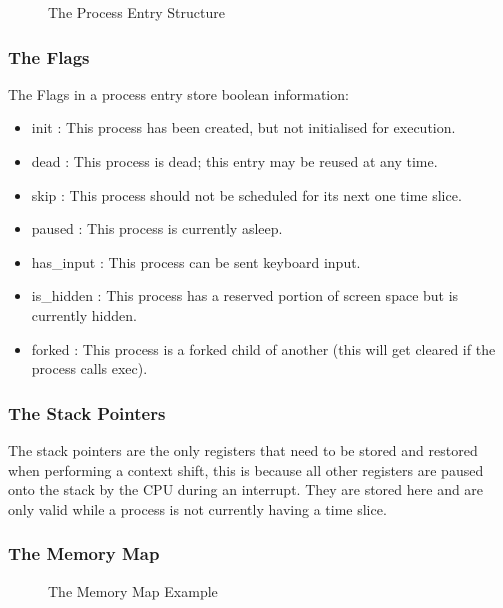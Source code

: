 \documentclass[a4paper]{report}
\begin{document}
\begin{figure}[ht]
  \centering

  \def\svgwidth{\columnwidth}
  \caption{The Process Entry Structure}
  \label{fig:schedulerscreen}
\end{figure}

\subsubsection{The Flags}

The Flags in a process entry store boolean information:
\begin{itemize}
\item init : This process has been created, but not initialised for execution.
\item dead : This process is dead; this entry may be reused at any time.
\item skip : This process should not be scheduled for its next one time slice.
\item paused : This process is currently asleep.
\item has\_input : This process can be sent keyboard input.
\item is\_hidden : This process has a reserved portion of screen space but is currently hidden.
\item forked : This process is a forked child of another (this will get cleared if the process calls exec).
\end{itemize}

\subsubsection{The Stack Pointers}
The stack pointers are the only registers that need to be stored and restored when performing a context shift, this is because all other registers are paused onto the stack by the CPU during an interrupt. They are stored here and are only valid while a process is not currently having a time slice.

\subsubsection{The Memory Map}
\begin{figure}[ht]
  \centering

  \def\svgwidth{\columnwidth}
  \caption{The Memory Map Example}
  \label{fig:schedulerscreen}
\end{figure}
\end{document}
